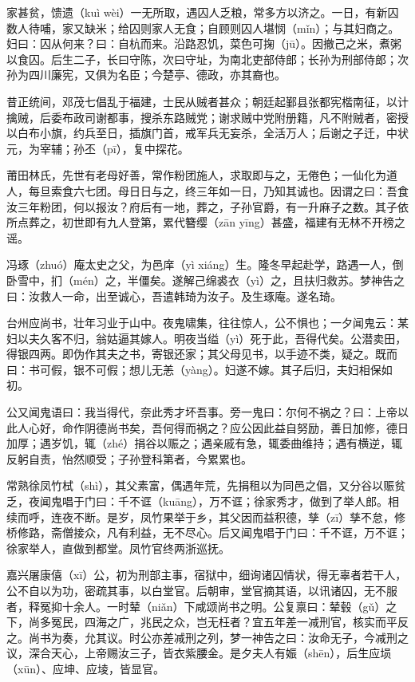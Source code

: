 \documentclass[12pt,UTF8]{ctexbook}
\begin{document}
家甚贫，馈遗（kuì  wèi）一无所取，遇囚人乏粮，常多方以济之。一日，有新囚数人待哺，家又缺米；给囚则家人无食；自顾则囚人堪悯（mǐn）；与其妇商之。妇曰：囚从何来？曰：自杭而来。沿路忍饥，菜色可掬（jū）。因撤己之米，煮粥以食囚。后生二子，长曰守陈，次曰守址，为南北吏部侍郎；长孙为刑部侍郎；次孙为四川廉宪，又俱为名臣；今楚亭、德政，亦其裔也。

昔正统间，邓茂七倡乱于福建，士民从贼者甚众；朝廷起鄞县张都宪楷南征，以计擒贼，后委布政司谢都事，搜杀东路贼党；谢求贼中党附册籍，凡不附贼者，密授以白布小旗，约兵至日，插旗门首，戒军兵无妄杀，全活万人；后谢之子迁，中状元，为宰辅；孙丕（pī），复中探花。

莆田林氏，先世有老母好善，常作粉团施人，求取即与之，无倦色；一仙化为道人，每旦索食六七团。母日日与之，终三年如一日，乃知其诚也。因谓之曰：吾食汝三年粉团，何以报汝？府后有一地，葬之，子孙官爵，有一升麻子之数。其子依所点葬之，初世即有九人登第，累代簪缨（zān  yīng）甚盛，福建有无林不开榜之谣。

冯琢（zhuó）庵太史之父，为邑庠（yì  xiáng）生。隆冬早起赴学，路遇一人，倒卧雪中，扪（mén）之，半僵矣。遂解己绵裘衣（yì）之，且扶归救苏。梦神告之曰：汝救人一命，出至诚心，吾遣韩琦为汝子。及生琢庵。遂名琦。

台州应尚书，壮年习业于山中。夜鬼啸集，往往惊人，公不惧也；一夕闻鬼云：某妇以夫久客不归，翁姑逼其嫁人。明夜当缢（yì）死于此，吾得代矣。公潜卖田，得银四两。即伪作其夫之书，寄银还家；其父母见书，以手迹不类，疑之。既而曰：书可假，银不可假；想儿无恙（yàng）。妇遂不嫁。其子后归，夫妇相保如初。

公又闻鬼语曰：我当得代，奈此秀才坏吾事。旁一鬼曰：尔何不祸之？曰：上帝以此人心好，命作阴德尚书矣，吾何得而祸之？应公因此益自努励，善日加修，德日加厚；遇岁饥，辄（zhé）捐谷以赈之；遇亲戚有急，辄委曲维持；遇有横逆，辄反躬自责，怡然顺受；子孙登科第者，今累累也。

常熟徐凤竹栻（shì），其父素富，偶遇年荒，先捐租以为同邑之倡，又分谷以赈贫乏，夜闻鬼唱于门曰：千不诓（kuāng），万不诓；徐家秀才，做到了举人郎。相续而呼，连夜不断。是岁，凤竹果举于乡，其父因而益积德，孳（zī）孳不怠，修桥修路，斋僧接众，凡有利益，无不尽心。后又闻鬼唱于门曰：千不诓，万不诓；徐家举人，直做到都堂。凤竹官终两浙巡抚。

嘉兴屠康僖（xī）公，初为刑部主事，宿狱中，细询诸囚情状，得无辜者若干人，公不自以为功，密疏其事，以白堂官。后朝审，堂官摘其语，以讯诸囚，无不服者，释冤抑十余人。一时辇（niǎn）下咸颂尚书之明。公复禀曰：辇毂（gǔ）之下，尚多冤民，四海之广，兆民之众，岂无枉者？宜五年差一减刑官，核实而平反之。尚书为奏，允其议。时公亦差减刑之列，梦一神告之曰：汝命无子，今减刑之议，深合天心，上帝赐汝三子，皆衣紫腰金。是夕夫人有娠（shēn），后生应埙（xūn）、应坤、应堎，皆显官。
\end{document}
